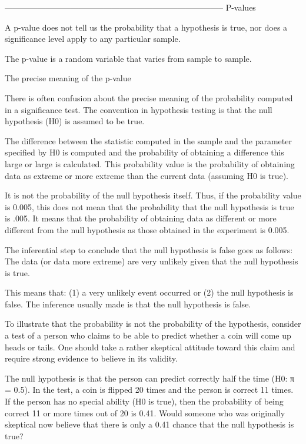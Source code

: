 

--------------------------------------------------------------------------------
P-values

A p-value does not tell us the probability that a hypothesis is true, nor does a significance level apply to any particular sample.



The p-value is a random variable that varies from sample to sample.


The precise meaning of the p-value


There is often confusion about the precise meaning of the probability computed in a significance test. The convention in hypothesis testing is that the null hypothesis (H0) is assumed to be true. 


The difference between the statistic computed in the sample and the parameter specified by H0 is computed and the probability of obtaining a difference this large or large is calculated. This probability value is the probability of obtaining data as extreme or more extreme than the current data (assuming H0 is true). 


It is not the probability of the null hypothesis itself. Thus, if the probability value is 0.005, this does not mean that the probability that the null hypothesis is true is .005. It means that the probability of obtaining data as different or more different from the null hypothesis as those obtained in the experiment is 0.005.


The inferential step to conclude that the null hypothesis is false goes as follows: The data (or data more extreme) are very unlikely given that the null hypothesis is true. 

This means that: (1) a very unlikely event occurred or (2) the null hypothesis is false. The inference usually made is that the null hypothesis is false. 


To illustrate that the probability is not the probability of the hypothesis, consider a test of a person who claims to be able to predict whether a coin will come up heads or tails. One should take a rather skeptical attitude toward this claim and require strong evidence to believe in its validity. 


The null hypothesis is that the person can predict correctly half the time (H0: π = 0.5). In the test, a coin is flipped 20 times and the person is correct 11 times. If the person has no special ability (H0 is true), then the probability of being correct 11 or more times out of 20 is 0.41. Would someone who was originally skeptical now believe that there is only a 0.41 chance that the null hypothesis is true? 


